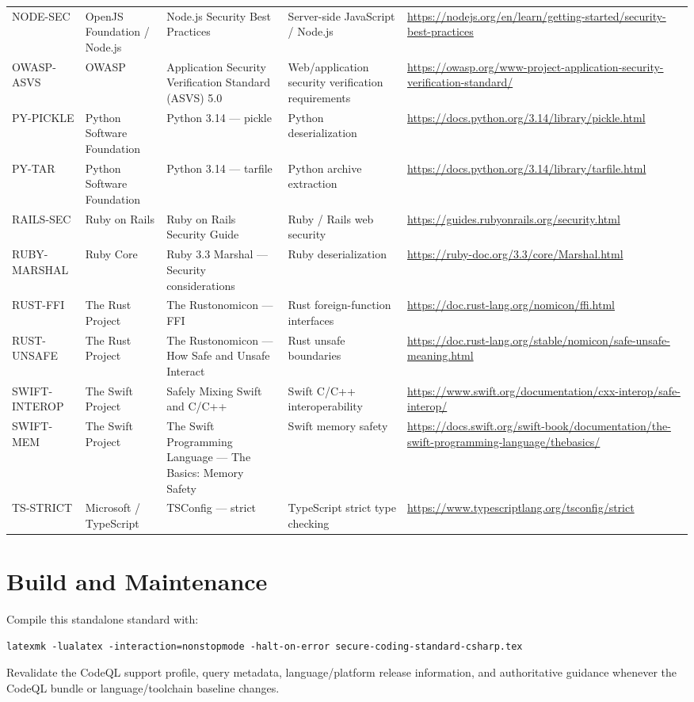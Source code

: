 \documentclass[10pt,letterpaper]{article}
\begin{document}
\begin{landscape}
\begin{longtable}{@{}P{0.82in}P{1.23in}P{2.25in}P{1.7in}P{3.0in}@{}}
NODE-SEC & OpenJS Foundation / Node.js & Node.js Security Best Practices & Server-side JavaScript / Node.js & \url{https://nodejs.org/en/learn/getting-started/security-best-practices}\\
OWASP-ASVS & OWASP & Application Security Verification Standard (ASVS) 5.0 & Web/application security verification requirements & \url{https://owasp.org/www-project-application-security-verification-standard/}\\
PY-PICKLE & Python Software Foundation & Python 3.14 --- pickle & Python deserialization & \url{https://docs.python.org/3.14/library/pickle.html}\\
PY-TAR & Python Software Foundation & Python 3.14 --- tarfile & Python archive extraction & \url{https://docs.python.org/3.14/library/tarfile.html}\\
RAILS-SEC & Ruby on Rails & Ruby on Rails Security Guide & Ruby / Rails web security & \url{https://guides.rubyonrails.org/security.html}\\
RUBY-MARSHAL & Ruby Core & Ruby 3.3 Marshal --- Security considerations & Ruby deserialization & \url{https://ruby-doc.org/3.3/core/Marshal.html}\\
RUST-FFI & The Rust Project & The Rustonomicon --- FFI & Rust foreign-function interfaces & \url{https://doc.rust-lang.org/nomicon/ffi.html}\\
RUST-UNSAFE & The Rust Project & The Rustonomicon --- How Safe and Unsafe Interact & Rust unsafe boundaries & \url{https://doc.rust-lang.org/stable/nomicon/safe-unsafe-meaning.html}\\
SWIFT-INTEROP & The Swift Project & Safely Mixing Swift and C/C++ & Swift C/C++ interoperability & \url{https://www.swift.org/documentation/cxx-interop/safe-interop/}\\
SWIFT-MEM & The Swift Project & The Swift Programming Language --- The Basics: Memory Safety & Swift memory safety & \url{https://docs.swift.org/swift-book/documentation/the-swift-programming-language/thebasics/}\\
TS-STRICT & Microsoft / TypeScript & TSConfig --- strict & TypeScript strict type checking & \url{https://www.typescriptlang.org/tsconfig/strict}\\
\bottomrule
\end{longtable}
\normalsize
\end{landscape}

\appendix
\section{Build and Maintenance}
Compile this standalone standard with:
\begin{lstlisting}
latexmk -lualatex -interaction=nonstopmode -halt-on-error secure-coding-standard-csharp.tex
\end{lstlisting}
Revalidate the CodeQL support profile, query metadata, language/platform release information, and authoritative guidance whenever the CodeQL bundle or language/toolchain baseline changes.
\end{document}
